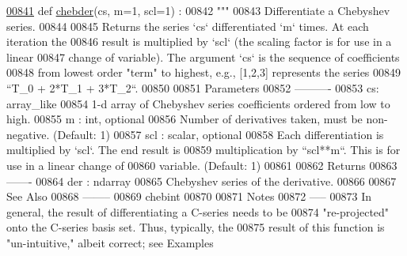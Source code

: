 \begin{DoxyCode}
\hypertarget{namespacepyneb_1_1utils_1_1chebyshev_l00841}{}\hyperlink{namespacepyneb_1_1utils_1_1chebyshev_a1ed2b9248c247449584904025ec9d460}{00841} \textcolor{keyword}{def }\hyperlink{namespacepyneb_1_1utils_1_1chebyshev_a1ed2b9248c247449584904025ec9d460}{chebder}(cs, m=1, scl=1) :
00842     \textcolor{stringliteral}{"""}
00843 \textcolor{stringliteral}{    Differentiate a Chebyshev series.}
00844 \textcolor{stringliteral}{}
00845 \textcolor{stringliteral}{    Returns the series `cs` differentiated `m` times.  At each iteration the}
00846 \textcolor{stringliteral}{    result is multiplied by `scl` (the scaling factor is for use in a linear}
00847 \textcolor{stringliteral}{    change of variable).  The argument `cs` is the sequence of coefficients}
00848 \textcolor{stringliteral}{    from lowest order "term" to highest, e.g., [1,2,3] represents the series}
00849 \textcolor{stringliteral}{    ``T\_0 + 2*T\_1 + 3*T\_2``.}
00850 \textcolor{stringliteral}{}
00851 \textcolor{stringliteral}{    Parameters}
00852 \textcolor{stringliteral}{    ----------}
00853 \textcolor{stringliteral}{    cs: array\_like}
00854 \textcolor{stringliteral}{        1-d array of Chebyshev series coefficients ordered from low to high.}
00855 \textcolor{stringliteral}{    m : int, optional}
00856 \textcolor{stringliteral}{        Number of derivatives taken, must be non-negative. (Default: 1)}
00857 \textcolor{stringliteral}{    scl : scalar, optional}
00858 \textcolor{stringliteral}{        Each differentiation is multiplied by `scl`.  The end result is}
00859 \textcolor{stringliteral}{        multiplication by ``scl**m``.  This is for use in a linear change of}
00860 \textcolor{stringliteral}{        variable. (Default: 1)}
00861 \textcolor{stringliteral}{}
00862 \textcolor{stringliteral}{    Returns}
00863 \textcolor{stringliteral}{    -------}
00864 \textcolor{stringliteral}{    der : ndarray}
00865 \textcolor{stringliteral}{        Chebyshev series of the derivative.}
00866 \textcolor{stringliteral}{}
00867 \textcolor{stringliteral}{    See Also}
00868 \textcolor{stringliteral}{    --------}
00869 \textcolor{stringliteral}{    chebint}
00870 \textcolor{stringliteral}{}
00871 \textcolor{stringliteral}{    Notes}
00872 \textcolor{stringliteral}{    -----}
00873 \textcolor{stringliteral}{    In general, the result of differentiating a C-series needs to be}
00874 \textcolor{stringliteral}{    "re-projected" onto the C-series basis set. Thus, typically, the}
00875 \textcolor{stringliteral}{    result of this function is "un-intuitive," albeit correct; see Examples}

\end{DoxyCode}
